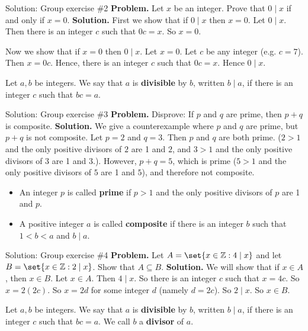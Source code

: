 \documentclass[10pt]{beamer}
\begin{document}
\begin{frame}{Solution: Group exercise \#2}
\textbf{Problem.} Let $x$ be an integer. Prove that $0 \mid x$ if and only if $x=0$.
\vfill 
\textbf{Solution.}  First we show that if $0 \mid x$ then $x=0$.  Let $0 \mid x$. Then there is an integer $c$ such that $0c=x$.  So $x=0$.

Now we show that if $x=0$ then $0 \mid x$.  Let $x=0$.  Let $c$ be any integer (e.g. $c=7$).  Then $x=0c$. Hence, there is an integer $c$ such that $0c=x$.  Hence $0 \mid x$. 

\vfill
\begin{mygreenbox}[title={Reference: Definition}]
Let $a,b$ be integers.  We say that $a$ is \textbf{divisible} by $b$, written $b \mid a$, if there is an integer $c$ such that $bc=a$. 
\end{mygreenbox}

\end{frame}



\begin{frame}{Solution: Group exercise \#3 }
\textbf{Problem.} Disprove: If $p$ and $q$ are prime, then $p+q$ is composite.
	\vfill
\textbf{Solution.} We give a counterexample where $p$ and $q$ are prime, but $p+q$ is not composite.  Let $p=2$ and $q=3$.  Then $p$ and $q$ are both prime. ($2>1$ and the only positive divisors of $2$ are 1 and $2$, and  $3>1$ and the only positive divisors of $3$ are 1 and $3$.). However, $p+q=5$, which is prime  ($5>1$ and the only positive divisors of $5$ are 1 and $5$), and therefore not composite.
\vfill 
\begin{mygreenbox}[title={Reference: Definitions}]
\begin{itemize}
	\item An integer $p$ is called \textbf{prime} if $p>1$ and the only positive divisors of $p$ are 1 and $p$.
	\item A positive integer $a$ is called \textbf{composite} if there is an integer $b$ such that  $1<b<a$ and $b \mid a$.
\end{itemize}
	
\end{mygreenbox}

\end{frame}


\begin{frame}{Solution: Group exercise \#4}
\textbf{Problem.}   Let $A = \set{x \in \mathbb{Z} : 4 \mid x}$ and let $B = \set{x \in \mathbb{Z} : 2 \mid x}$. Show that $A \subseteq B$. 
\vfill
\textbf{Solution.} We will show that if $x \in A$, then $x \in B$. Let $x \in A$.  Then $4 \mid x$. So there is an integer $c$ such that $x=4c$.  So $x=2(2c)$.  So $x=2d$ for some integer $d$ (namely $d=2c$). So $2 \mid x$.  So $x \in B$.

\vfill
\begin{mygreenbox}[title={Reference: Definition}]
Let $a,b$ be integers.  We say that $a$ is \textbf{divisible} by $b$, written $b \mid a$, if there is an integer $c$ such that $bc=a$. We call $b$ a \textbf{divisor} of $a$.	
\end{mygreenbox}

\end{frame}
\end{document}
